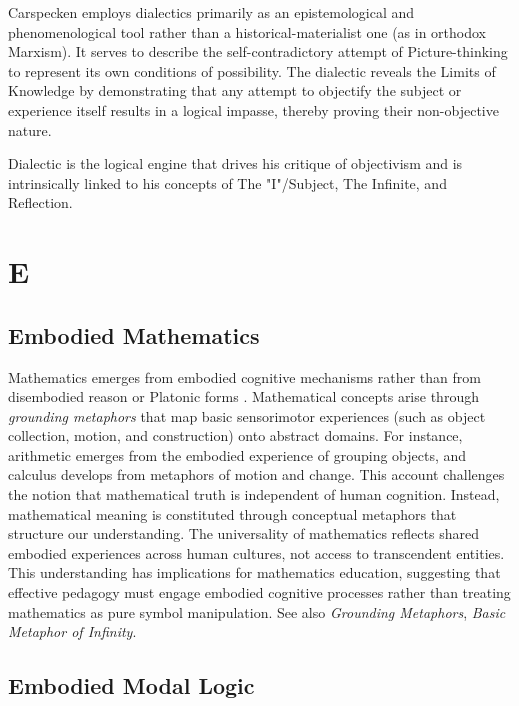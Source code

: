 \documentclass{book}
\begin{document}
Carspecken employs dialectics primarily as an epistemological and phenomenological tool rather than a historical-materialist one (as in orthodox Marxism). It serves to describe the self-contradictory attempt of Picture-thinking to represent its own conditions of possibility. The dialectic reveals the Limits of Knowledge by demonstrating that any attempt to objectify the subject or experience itself results in a logical impasse, thereby proving their non-objective nature.

Dialectic is the logical engine that drives his critique of objectivism and is intrinsically linked to his concepts of The "I"/Subject, The Infinite, and Reflection.

\parencite{Carspecken2009aa}

\chapter{E}

\section{Embodied Mathematics}

Mathematics emerges from embodied cognitive mechanisms rather than from disembodied reason or Platonic forms \parencite{Lakoff2000}. Mathematical concepts arise through \textit{grounding metaphors} that map basic sensorimotor experiences (such as object collection, motion, and construction) onto abstract domains. For instance, arithmetic emerges from the embodied experience of grouping objects, and calculus develops from metaphors of motion and change. This account challenges the notion that mathematical truth is independent of human cognition. Instead, mathematical meaning is constituted through conceptual metaphors that structure our understanding. The universality of mathematics reflects shared embodied experiences across human cultures, not access to transcendent entities. This understanding has implications for mathematics education, suggesting that effective pedagogy must engage embodied cognitive processes rather than treating mathematics as pure symbol manipulation. See also \textit{Grounding Metaphors}, \textit{Basic Metaphor of Infinity}.

\section{Embodied Modal Logic}
\end{document}
